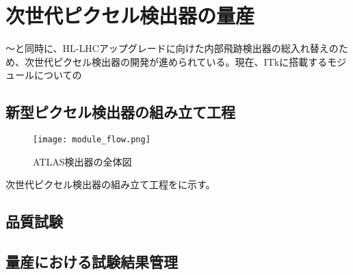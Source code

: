 \chapter{次世代ピクセル検出器の量産}
\label{sec:singatapixel-devel}
〜と同時に、HL-LHCアップグレードに向けた内部飛跡検出器の総入れ替えのため、次世代ピクセル検出器の開発が進められている。現在、ITkに搭載するモジュールについての





\section{新型ピクセル検出器の組み立て工程}
\label{sec:assemble}
\begin{figure}[tbp]
  \centering
  \texttt{[image: module\_flow.png]}
  \caption[ATLAS検出器]{ATLAS検出器の全体図 \cite{studyofID} }
  \label{fig:assemble}
\end{figure}


次世代ピクセル検出器の組み立て工程をに示す。





\section{品質試験}
\label{sec:QC}

\subsection{}

\section{量産における試験結果管理}
\label{sec:}



\newpage
